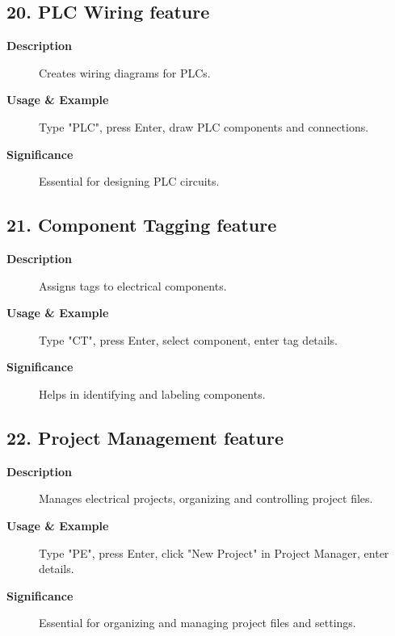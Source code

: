\documentclass[12pt]{article}
\begin{document}
\subsection*{20. PLC Wiring feature}
\begin{description}
    \item [\textbf{Description}] Creates wiring diagrams for PLCs.
    \item [\textbf{Usage \& Example}] Type "PLC", press Enter, draw PLC components and connections.
    \item [\textbf{Significance}] Essential for designing PLC circuits.
\end{description}

\subsection*{21. Component Tagging feature}
\begin{description}
    \item [\textbf{Description}] Assigns tags to electrical components.
    \item [\textbf{Usage \& Example}] Type "CT", press Enter, select component, enter tag details.
    \item [\textbf{Significance}] Helps in identifying and labeling components.
\end{description}

\subsection*{22. Project Management feature}
\begin{description}
    \item [\textbf{Description}] Manages electrical projects, organizing and controlling project files.
    \item [\textbf{Usage \& Example}] Type "PE", press Enter, click "New Project" in Project Manager, enter details.
    \item [\textbf{Significance}] Essential for organizing and managing project files and settings.
\end{description}
\end{document}
